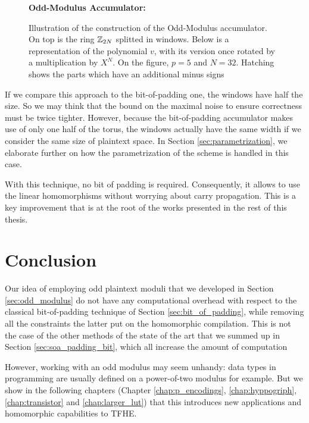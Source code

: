 \begin{figure}[H]
	\centering
	
	\vspace{1.5em}
%	
	\textbf{Odd-Modulus Accumulator:}\\[0.5em]
%	
	\caption{Illustration of the construction of the Odd-Modulus accumulator. On top is the ring $\mathbb{Z}_{2N}$ splitted in windows. Below is a representation of the polynomial $v$, with its version once rotated by a multiplication by $X^N$. On the figure, $p = 5$ and $N = 32$. Hatching shows the parts which have an additional minus signs}
	\label{fig:accumulator_odd}
\end{figure}


If we compare this approach to the bit-of-padding one, the windows have half the size. So we may think that the bound on the maximal noise to ensure correctness must be twice tighter. However, because the bit-of-padding accumulator makes use of only one half of the torus, the windows actually have the same width if we consider the same size of plaintext space. In Section \ref{sec:parametrization}, we elaborate further on how the parametrization of the scheme is handled in this case.


With this technique, no bit of padding is required. Consequently, it allows to use the linear homomorphisms without worrying about carry propagation. This is a key improvement that is at the root of the works presented in the rest of this thesis.





\section{Conclusion}

Our idea of employing odd plaintext moduli that we developed in Section \ref{sec:odd_modulus} do not have any computational overhead with respect to the classical bit-of-padding technique of Section \ref{sec:bit_of_padding}, while removing all the constraints the latter put on the homomorphic compilation. This is not the case of the other methods of the state of the art that we summed up in Section \ref{sec:soa_padding_bit}, which all increase the amount of computation 

However, working with an odd modulus may seem unhandy: data types in programming are usually defined on a power-of-two modulus for example. But we show in the following chapters (Chapter \ref{chap:p_encodings}, \ref{chap:hyppogriph}, \ref{chap:transistor} and \ref{chap:larger_lut}) that this introduces new applications and homomorphic capabilities to \gls{TFHE}.

